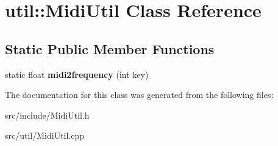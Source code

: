 \hypertarget{classutil_1_1MidiUtil}{\section{util\-:\-:Midi\-Util Class Reference}
\label{classutil_1_1MidiUtil}
}
\subsection*{Static Public Member Functions}
\begin{DoxyCompactItemize}
\item 
\hypertarget{classutil_1_1MidiUtil_a04b46794718bd5d4eeaa58b110bea689}{static float {\bfseries midi2frequency} (int key)}\label{classutil_1_1MidiUtil_a04b46794718bd5d4eeaa58b110bea689}

\end{DoxyCompactItemize}


The documentation for this class was generated from the following files\-:\begin{DoxyCompactItemize}
\item 
src/include/Midi\-Util.\-h\item 
src/util/Midi\-Util.\-cpp\end{DoxyCompactItemize}
